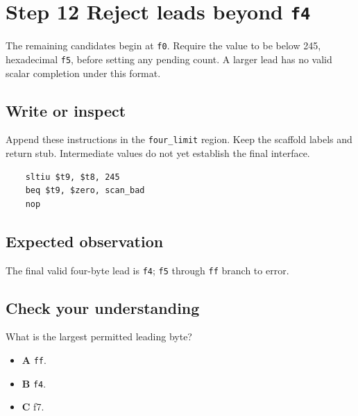 \section{Step 12 Reject leads beyond \texttt{f4}}\label{utf8-s12}

The remaining candidates begin at \texttt{f0}. Require the value to be below 245, hexadecimal \texttt{f5}, before setting any pending count. A larger lead has no valid scalar completion under this format.

\subsection{Write or inspect}
Append these instructions in the \texttt{four\_limit} region. Keep the scaffold labels and return stub. Intermediate values do not yet establish the final interface.

\begin{verbatim}
    sltiu $t9, $t8, 245
    beq $t9, $zero, scan_bad
    nop
\end{verbatim}

\subsection{Expected observation}
The final valid four-byte lead is \texttt{f4}; \texttt{f5} through \texttt{ff} branch to error.

\subsection{Check your understanding}
What is the largest permitted leading byte?

\begin{itemize}
  \item \textbf{A} \texttt{ff}.
  \item \textbf{B} \texttt{f4}.
  \item \textbf{C} f7.
\end{itemize}
